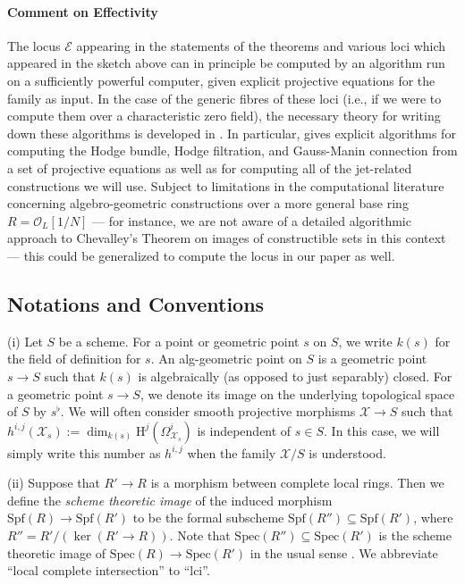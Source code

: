\documentclass[letter, 11pt]{article}
\theoremstyle{plain}
\theoremstyle{definition}
\newcommand{\Spec}{\mathrm{Spec}}
\newcommand{\<}{\langle}
\renewcommand{\>}{\rangle}
\newcommand{\sX}{\mathcal{X}}
\newcommand{\sE}{\mathcal{E}}
\renewcommand{\H}{\mathrm{H}}
\newcommand{\Spf}{\mathrm{Spf}}
\begin{document}
\vspace{0.5em}

\paragraph{Comment on Effectivity} The locus $\sE$ appearing in the statements of the theorems and various loci which appeared in the sketch above can in principle be computed by an algorithm run on a sufficiently powerful computer, given explicit projective equations for the family as input. In the case of the generic fibres of these loci (i.e., if we were to compute them over a characteristic zero field), the necessary theory for writing down these algorithms is developed in \cite{zbMATH07673321}. In particular, \cite{zbMATH07673321} gives explicit algorithms for computing the Hodge bundle, Hodge filtration, and Gauss-Manin connection from a set of projective equations as well as for computing all of the jet-related constructions we will use. Subject to limitations in the computational literature concerning algebro-geometric constructions over a more general base ring $R = \mathcal{O}_{L}[1/N]$ --- for instance, we are not aware of a detailed algorithmic approach to Chevalley's Theorem on images of constructible sets in this context --- this could be generalized to compute the locus in our paper as well.


\subsection{Notations and Conventions}
\label{sec: conventions}
(i) Let $S$ be a scheme. For a point or geometric point $s$ on $S$, we write $k(s)$ for the field of definition for $s$. An alg-geometric point on $S$ is a geometric point $s \to S$ such that $k(s)$ is algebraically (as opposed to just separably) closed. For a geometric point $s \to S$, we denote its image on the underlying topological space of $S$ by $s^\flat$. We will often consider smooth projective morphisms $\sX \to S$ such that $h^{i, j}(\sX_s) := \dim_{k(s)} \H^j(\Omega^i_{\sX_s})$ is independent of $s \in S$. In this case, we will simply write this number as $h^{i, j}$ when the family $\sX/S$ is understood. 

(ii) Suppose that $R' \to R$ is a morphism between complete local rings. Then we define the \textit{scheme theoretic image} of the induced morphism $\Spf(R) \to \Spf(R')$ to be the formal subscheme $\Spf(R'') \subseteq \Spf(R')$, where $R'' = R'/(\ker(R' \to R))$. Note that $\Spec(R'') \subseteq \Spec(R')$ is the scheme theoretic image of $\Spec(R) \to \Spec(R')$ in the usual sense \cite[01R5]{stacks-project}. We abbreviate ``local complete intersection'' to ``lci''. 
\end{document}
